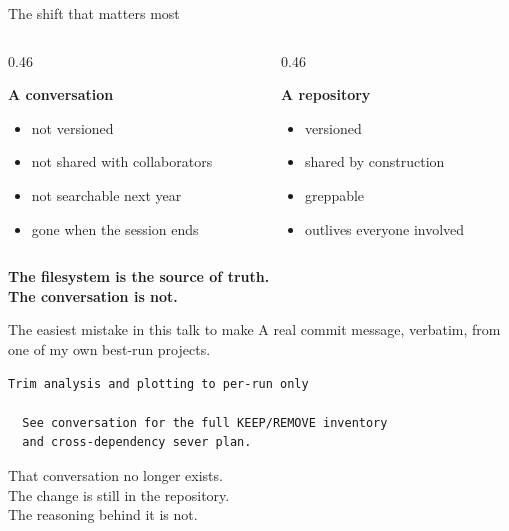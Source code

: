 
\begin{frame}{The shift that matters most}
  \vfill
  \begin{columns}[t]
    \begin{column}{0.46\textwidth}
      \begin{center}\textbf{A conversation}\end{center}
      \begin{itemize}
        \item not versioned
        \item not shared with collaborators
        \item not searchable next year
        \item gone when the session ends
      \end{itemize}
    \end{column}
    \begin{column}{0.46\textwidth}
      \begin{center}\textbf{A repository}\end{center}
      \begin{itemize}
        \item versioned
        \item shared by construction
        \item greppable
        \item outlives everyone involved
      \end{itemize}
    \end{column}
  \end{columns}
  \vfill
  \begin{center}
    {\large\color{NDBlue}\textbf{The filesystem is the source of truth.\\
     The conversation is not.}}
  \end{center}
  \vfill
\end{frame}

\begin{frame}[fragile]{The easiest mistake in this talk to make}
  \vfill
  {\scriptsize A real commit message, verbatim, from one of my own best-run projects.}
  \begin{lstlisting}
Trim analysis and plotting to per-run only

  See conversation for the full KEEP/REMOVE inventory
  and cross-dependency sever plan.
  \end{lstlisting}
  \vfill
  \begin{center}
    {\large That conversation no longer exists.}\\[0.7em]
    {The change is still in the repository.\\
     The reasoning behind it is not.}
  \end{center}
  \vfill
\end{frame}

